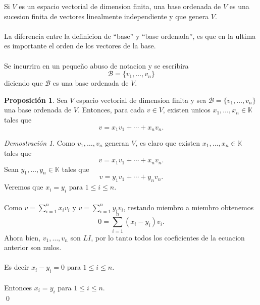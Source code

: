 \documentclass{article}
\theoremstyle{definition}
\theoremstyle{definition}
\newtheorem{prop}[teo]{Proposición}
\theoremstyle{remark}
\newtheorem*{demo}{Demostración}
\begin{document}
\begin{defi}
  Si $V$ es un espacio vectorial de dimension finita, una base ordenada de $V$ es una sucesion finita de vectores linealmente independiente y que genera $V$. \\\\ La diferencia entre la definicion de ``base'' y ``base ordenada'', es que en la ultima es importante el orden de los vectores de la base. \\\\ Se incurrira en un pequeño abuso de notacion y se escribira \[\mathcal{B}=\{v_1, \dots ,v_n\}\] diciendo que $\mathcal{B}$ es una base ordenada de $V$.
\end{defi}
\begin{prop}
  Sea $V$ espacio vectorial de dimension finita y sea $\mathcal{B}=\{v_1, \dots ,v_n\}$ una base ordenada de $V$. Entonces, para cada $v \in V$, existen unicos \mbox{$x_1, \dots ,x_n \in \mathbb{K}$} tales que \[
v=x_1v_1+ \cdots + x_n v_n.
\]
\end{prop}
\begin{demo}
  Como $v_1, \dots ,v_n$ generan $V$, es claro que existen $x_1, \dots ,x_n \in \mathbb{K}$ tales que \[
v=x_1v_1 + \cdots + x_nv_n.
  \]
  Sean $y_1, \dots ,y_n \in \mathbb{K}$ tales que \[
v=y_1v_1 + \cdots + y_nv_n.
  \]
  Veremos que $x_i=y_i$ para $1 \leq i \leq n$. \\\\ Como $v=\sum_{i=1}^{n}x_i v_i$ y $v=\sum_{i=1}^{n}y_i v_i$, restando miembro a miembro obtenemos \[
    0=\sum_{i=1}^{n}(x_i-y_i)v_i.
  \]
  Ahora bien, $v_1, \dots ,v_n$ son $LI$, por lo tanto todos los coeficientes de la ecuacion anterior son nulos. \\\\ Es decir $x_i-y_i=0$ para $1 \leq i \leq n$. \\\\ Entonces $x_i =y_i$ para $1 \leq i \leq n$. \\ \qed 
\end{demo}
\pagebreak
\end{document}
